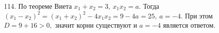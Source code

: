 114. По теореме Виета $x_1+x_2=3,\ x_1x_2=a.$ Тогда $(x_1-x_2)^2=(x_1+x_2)^2-4x_1x_2=9-4a=25,\ a=-4.$ При этом $D=9+16>0,$ значит корни существуют и $a=-4$ является ответом.\\
